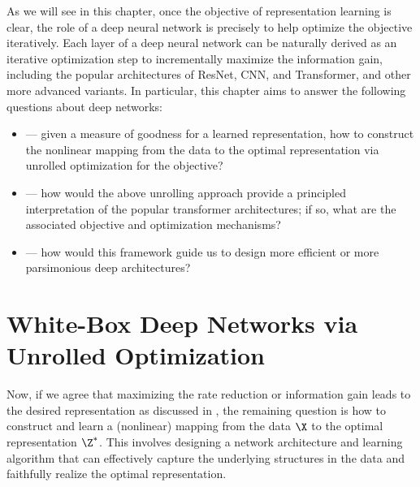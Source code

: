 \documentclass[../../book-main.tex]{subfiles}
\begin{document}
As we will see in this chapter, once the objective of representation learning is clear, the role of a deep neural network is precisely to help optimize the objective iteratively. Each layer of a deep neural network can be naturally derived as an iterative optimization step to incrementally maximize the information gain, including the popular architectures of ResNet, CNN, and Transformer, and other more advanced variants. In particular, this chapter aims to answer the following questions about deep networks:
\begin{itemize}
    \item {} --- given a measure of goodness for a learned representation, how to construct the nonlinear mapping from the data to the optimal representation via unrolled optimization for the objective?
    \item {} --- how would the above unrolling approach provide a principled interpretation of the popular transformer architectures; if so, what are the associated objective and optimization mechanisms? 
    \item {} --- how would this framework guide us to design more efficient or more parsimonious deep architectures?
\end{itemize}



















\section{White-Box Deep Networks via Unrolled Optimization}\label{sec:chap4-white-box-model-via-unrolling}


Now, if we agree that maximizing the rate reduction or information gain leads to the desired representation as discussed in , the remaining question is how to construct and learn a (nonlinear) mapping from the data $\X$ to the optimal representation $\Z^*$. This involves designing a network architecture and learning algorithm that can effectively capture the underlying structures in the data and faithfully realize the optimal representation. 
\end{document}
